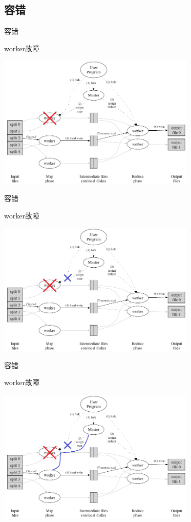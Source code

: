 \documentclass{beamer}
\begin{document}
\subsection{容错}
\begin{frame}{容错}
    \begin{block}{worker故障}
    \begin{center} \includegraphics[height=180pt]{keyan/mapreduce_worker_wrong.png} \end{center}
    \end{block}
\end{frame}
\begin{frame}{容错}
    \begin{block}{worker故障}
    \begin{center} \includegraphics[height=180pt]{keyan/mapreduce_worker_wrong1.png} \end{center}
    \end{block}
\end{frame}
\begin{frame}{容错}
    \begin{block}{worker故障}
    \begin{center} \includegraphics[height=180pt]{keyan/mapreduce_worker_wrong2.png} \end{center}
    \end{block}
\end{frame}
\end{document}
